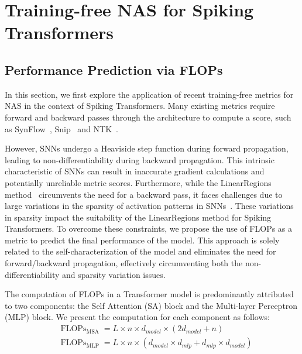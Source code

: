 \documentclass{article}
\theoremstyle{plain}
\theoremstyle{definition}
\theoremstyle{remark}
\begin{document}
\section{Training-free NAS for Spiking Transformers}
\vspace{-0.15em}


\subsection{Performance Prediction via FLOPs}

In this section, we first explore the application of recent training-free metrics for NAS in the context of Spiking Transformers. Many existing metrics require forward and backward passes through the architecture to compute a score, such as SynFlow~\cite{tanakaPruningNeuralNetworks2020a}, Snip~\cite{leeSnipSingleshotNetwork2018} and NTK~\cite{jacotNeuralTangentKernel2018}. 


However, SNNs undergo a Heaviside step function during forward propagation, leading to non-differentiability during backward propagation. This intrinsic characteristic of SNNs can result in inaccurate gradient calculations and potentially unreliable metric scores. Furthermore, while the LinearRegions method~\cite{mellorNeuralArchitectureSearch2021} circumvents the need for a backward pass, it faces challenges due to large variations in the sparsity of activation patterns in SNNs~\cite{kimNeuralArchitectureSearch2022}. These variations in sparsity impact the suitability of the LinearRegions method for Spiking Transformers. To overcome these constraints, we propose the use of FLOPs as a metric to predict the final performance of the model. This approach is solely related to the self-characterization of the model and eliminates the need for forward/backward propagation, effectively circumventing both the non-differentiability and sparsity variation issues.

The computation of FLOPs in a Transformer model is predominantly attributed to two components: the Self Attention (SA) block and the Multi-layer Perceptron (MLP) block. We present the computation for each component as follows:
\begin{align}
&\operatorname{FLOPs}_{\text{MSA}} = L \times n \times d_{model} \times (2d_{model} + n)
\label{eq:self-attention} \\
&\operatorname{FLOPs}_{\text{MLP}} = L \times n \times (d_{model} \times d_{mlp} + d_{mlp} \times d_{model})
\label{eq:ffn}
\end{align}
\end{document}
